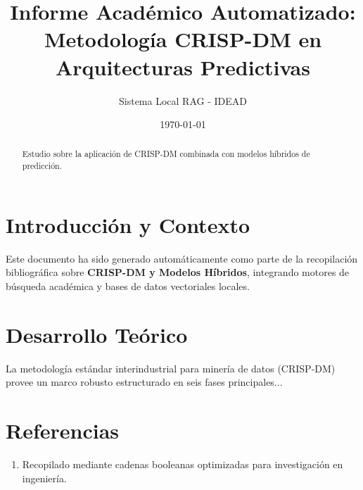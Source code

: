 \documentclass[12pt,a4paper]{article}
\title{\textbf{Informe Académico Automatizado: Metodología CRISP-DM en Arquitecturas Predictivas}}
\author{Sistema Local RAG - IDEAD}
\date{\today}
\begin{document}
\maketitle

\begin{abstract}
Estudio sobre la aplicación de CRISP-DM combinada con modelos híbridos de predicción.
\end{abstract}

\section{Introducción y Contexto}
Este documento ha sido generado automáticamente como parte de la recopilación bibliográfica sobre \textbf{CRISP-DM y Modelos Híbridos}, integrando motores de búsqueda académica y bases de datos vectoriales locales.

\section{Desarrollo Teórico}
La metodología estándar interindustrial para minería de datos (CRISP-DM) provee un marco robusto estructurado en seis fases principales...

\section{Referencias}
\begin{enumerate}
    \item Recopilado mediante cadenas booleanas optimizadas para investigación en ingeniería.
\end{enumerate}
\end{document}
